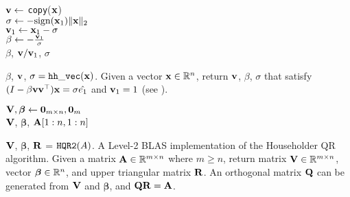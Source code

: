 \begin{algorithm2e}[H]
	\DontPrintSemicolon %
	$\mathbf{v}\gets$ {\tt copy}($\mathbf{x}$)\\
	$\sigma \gets -\rm{sign}(\mathbf{x}_1)\|\mathbf{x}\|_2$\\
	$\mathbf{v}_1 \gets \mathbf{x}_1-\sigma$ \\
	$\beta \gets -\frac{\mathbf{v}_1}{\sigma}$\\
	\Return $\beta$, $\mathbf{v}/\mathbf{v}_1$, $\sigma$
	\caption{$\beta$, $\mathbf{v}$, $\sigma = {\tt hh\_vec}(\mathbf{x})$. Given a vector $\mathbf{x}\in\mathbb{R}^n$, return $\mathbf{v}$, $\beta$, $\sigma$ that satisfy $(I-\beta \mathbf{v}\mathbf{v}^{\top})\mathbf{x} =\sigma\hat{e_1}$ and $\mathbf{v}_1=1$ (see \cite{LAPACK, Higham2002}).}
	\label{algo:hh_v2}
\end{algorithm2e}

\begin{algorithm2e}
	\DontPrintSemicolon
	
	$\mathbf{V}, \bm{\beta} \gets \mathbf{0}_{m\times n}, \mathbf{0}_m$ \\
	
	\Return $\mathbf{V}$, $\bm{\beta}$, $\mathbf{A}[1:n, 1:n]$
	\caption{$\mathbf{V}$, $\bm{\beta}$, $\mathbf{R}$ = ${\tt HQR2}(A)$. A Level-2 BLAS implementation of the Householder QR algorithm. Given a matrix $\mathbf{A}\in\mathbb{R}^{m\times n}$ where $m\geq n$, return matrix $\mathbf{V}\in\mathbb{R}^{m\times n}$, vector $\bm{\beta}\in\mathbb{R}^{n}$, and upper triangular matrix $\mathbf{R}$. An orthogonal matrix $\mathbf{Q}$ can be generated from $\mathbf{V}$ and $\bm{\beta}$, and $\mathbf{QR}=\mathbf{A}$.}
	\label{algo:hhQR}
\end{algorithm2e}
